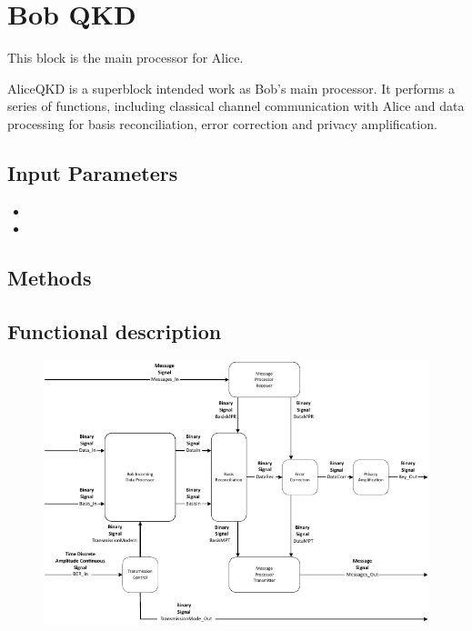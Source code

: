 \clearpage

\section{Bob QKD}

\maketitle
This block is the main processor for Alice. 

AliceQKD is a superblock intended work as Bob's main processor. It performs a 
series of functions, including classical channel communication with Alice and 
data processing for basis reconciliation, error correction and privacy 
amplification.

\subsection*{Input Parameters}

	\begin{itemize}
		\item
		\item
		
	\end{itemize}

\subsection*{Methods}



\subsection*{Functional description}
\begin{figure}[H]
	\centering
	\includegraphics{./lib/bob_qkd2/figures/BobQKD_blockDiagram.pdf}
\end{figure}

